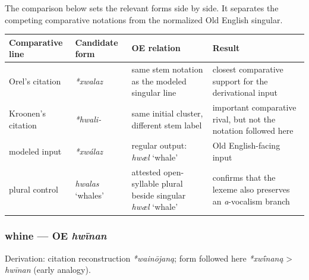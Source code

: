 \documentclass[
  british,
  a4paper,
]{article}
\newcounter{none} %
\begin{document}
The comparison below sets the relevant forms side by side. It separates
the competing comparative notations from the normalized Old English
singular.

{\def\LTcaptype{none} %
\begin{longtable}[]{@{}
  >{\raggedright\arraybackslash}p{}
  >{\raggedright\arraybackslash}p{}
  >{\raggedright\arraybackslash}p{}
  >{\raggedright\arraybackslash}p{}@{}}
\toprule\noalign{}
\begin{minipage}[b]{\linewidth}\raggedright
Comparative line
\end{minipage} & \begin{minipage}[b]{\linewidth}\raggedright
Candidate form
\end{minipage} & \begin{minipage}[b]{\linewidth}\raggedright
OE relation
\end{minipage} & \begin{minipage}[b]{\linewidth}\raggedright
Result
\end{minipage} \\
\midrule\noalign{}
\endhead
\bottomrule\noalign{}
\endlastfoot
Orel's citation & {\emph{*xwalaz}} & same stem notation as the modeled
singular line & closest comparative support for the derivational
input \\
Kroonen's citation & {\emph{*hwali-}} & same initial cluster, different
stem label & important comparative rival, but not the notation followed
here \\
modeled input & {\emph{*xwálaz}} & regular output: {\emph{hwæl}} `whale'
& Old English-facing input \\
plural control & {\emph{hwalas}} `whales' & attested open-syllable
plural beside singular {\emph{hwæl}} `whale' & confirms that the lexeme
also preserves an \emph{a}-vocalism branch \\
\end{longtable}
}

\subsubsection{\texorpdfstring{whine --- OE
\emph{hwīnan}}{whine --- OE hwīnan}}\label{whine-oe-hwux12bnan}

Derivation: citation reconstruction \emph{*wainōjaną}; form followed
here \emph{*xwī́naną} \textgreater{} \emph{hwīnan} (early analogy).
\end{document}
